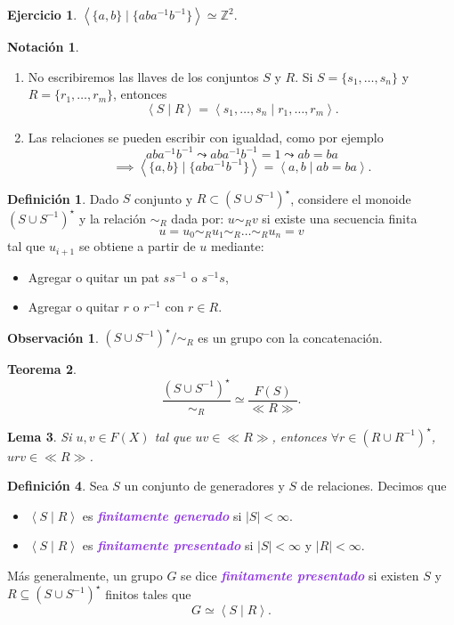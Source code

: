 \documentclass{article}
\newtheorem{theorem}{Teorema}[subsection]
\newtheorem{lemma}[theorem]{Lema}
\theoremstyle{definition}
\newtheorem{definition}[theorem]{Definición}
\newtheorem{exercise}{Ejercicio}
\newtheorem*{notation}{Notación}
\newtheorem*{obs}{Observación}
\theoremstyle{remark}
\numberwithin{equation}{section}
\newcommand{\Z}{\mathbb{Z}}
\newcommand{\oo}{\infty}
\newcommand{\abs}[1]{\left| #1 \right|}
\newcommand{\gen}[1]{\left\langle #1 \right\rangle}
\newcommand{\wea}[1]{\textcolor{BlueViolet}{\textbf{\emph{#1}}}}
\begin{document}
\begin{exercise}
  $\gen{\{a,b\} \mid \{aba^{-1} b^{-1}\}} \simeq \Z^2$.
\end{exercise}

\begin{notation}
  \
  \begin{enumerate}[(1)]
    \item No escribiremos las llaves de los conjuntos $S$ y $R$. Si $S = \{s_1, \dots, s_n\}$ y $R = \{r_1, \dots, r_m\}$, entonces
    \[\gen{S \mid R} = \gen{s_1,\dots, s_n \mid r_1, \dots, r_m}.\]
    \item Las relaciones se pueden escribir con igualdad, como por ejemplo
    \[aba^{-1}b^{-1} \leadsto aba^{-1} b^{-1} = 1 \leadsto ab=ba\]
    \[\implies \gen{\{a,b\} \mid \{aba^{-1}b^{-1}\}} = \gen{a,b \mid ab=ba}.\]
  \end{enumerate}
\end{notation}

\begin{definition}
  Dado $S$ conjunto y $R \subset (S \cup S^{-1})^\star$, considere el monoide $(S \cup S^{-1})^\star$ y la relación $\sim_R$ dada por:
  $u \sim_R v$ si existe una secuencia finita
  \[u = u_0 \sim_R u_1 \sim_R \dots \sim_R u_n = v\]
  tal que $u_{i+1}$ se obtiene a partir de $u$ mediante:
  \begin{itemize}[(1)]
    \item Agregar o quitar un pat $ss^{-1}$ o $s^{-1}s$,
    \item Agregar o quitar $r$ o $r^{-1}$ con $r \in R$.
  \end{itemize}
\end{definition}

\begin{obs}
  $(S \cup S^{-1})^\star/\sim_R$ es un grupo con la concatenación.
\end{obs}

\begin{theorem}
  $$\frac{(S \cup S^{-1})^\star}{\sim_R} \simeq \frac{F(S)}{\ll R \gg}.$$
\end{theorem}

\begin{lemma}
  Si $u,v \in F(X)$ tal que $uv \in \ll R \gg$, entonces $\forall r \in (R \cup R^{-1})^\star$, $urv \in \ll R \gg$.
\end{lemma}

\begin{definition}
  Sea $S$ un conjunto de generadores y $S$ de relaciones. Decimos que
  \begin{itemize}[(1)]
    \item $\gen{S \mid R}$ es \wea{finitamente generado} si $\abs S < \oo$.
    \item $\gen{S \mid R}$ es \wea{finitamente presentado} si $\abs S < \oo$ y $\abs R < \oo$.
  \end{itemize}
  Más generalmente, un grupo $G$ se dice \wea{finitamente presentado} si existen $S$ y $R \subseteq (S \cup S^{-1})^\star$ finitos tales que
  \[G \simeq \gen{S \mid R}.\]
\end{definition}
\end{document}
